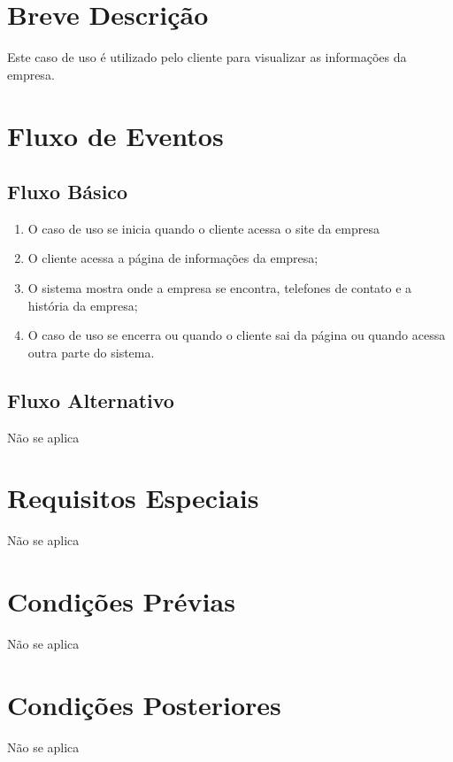 \section{Breve Descrição}

Este caso de uso é utilizado pelo cliente para visualizar as informações da empresa. 


\section{Fluxo de Eventos}
\subsection{Fluxo Básico}

\begin{enumerate}
	\item O caso de uso se inicia quando o cliente acessa o site da empresa
	\item O cliente acessa a página de informações da empresa;
	\item O sistema mostra onde a empresa se encontra, telefones de contato e a história da empresa;
	\item O caso de uso se encerra ou quando o cliente sai da página ou quando acessa outra parte do sistema.
\end{enumerate}

\subsection{Fluxo Alternativo}

Não se aplica

\section{Requisitos Especiais}

Não se aplica

\section{Condições Prévias}

Não se aplica

\section{Condições Posteriores}

Não se aplica